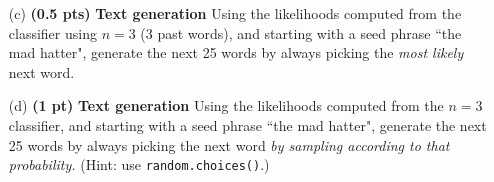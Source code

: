 \documentclass{article}
\newcommand{\showpoints}[1]{\textbf{(#1)}}
\begin{document}
\begin{enumerate}
\begin{itemize}
\item[(c)]  \showpoints{0.5 pts} \textbf{Text generation} Using the likelihoods computed from the  classifier using $n =3$ (3 past words), and starting with a seed phrase ``the mad hatter", generate the next 25 words by always picking the \emph{most likely} next word.



\item[(d)]  \showpoints{1 pt} \textbf{Text generation} Using the likelihoods computed from the $n = 3$  classifier, and starting with a seed phrase ``the mad hatter", generate the next 25 words by always picking the next word \emph{by sampling according to that probability.} (Hint: use \texttt{random.choices()}.)





\end{itemize}






\end{enumerate}
\end{document}
